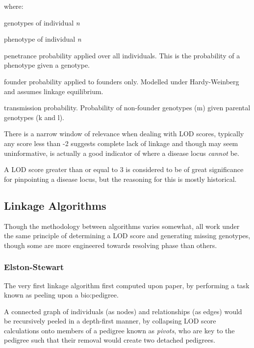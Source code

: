 where:
\begin{spacing}{1}
\begin{description}[labelsep=2em, align=right, labelwidth=3em, labelindent=4em, leftmargin=*]
\item[\(g_n\)]{genotypes of individual \textit{n}}
\item[\(Y_n\)]{phenotype of individual \textit{n}}
\item[\(P(Y_i|g_i)\)]{penetrance probability applied over all individuals. This is the probability of a phenotype given a genotype.}
\item[\(P(g_j)\)]{founder probability applied to founders only. Modelled under Hardy-Weinberg and assumes linkage equilibrium.}
\item[\(P(g_m|g_k,g_l)\)]{transmission probability. Probability of non-founder genotypes (m) given parental genotypes (k and l).}
\end{description}
\end{spacing}


There is a narrow window of relevance when dealing with LOD scores, typically any score less than -2 suggests complete lack of linkage and though may seem uninformative, is actually a good indicator of where a disease locus \textit{cannot} be.

A LOD score greater than or equal to 3 is considered to be of great significance for pinpointing a disease locus, but the reasoning for this is mostly historical.

\subsection{Linkage Algorithms}

Though the methodology between algorithms varies somewhat, all work under the same principle of determining a LOD score and generating missing genotypes, though some are more engineered towards resolving phase than others.

\subsubsection{Elston-Stewart}

The very first linkage algorithm first computed upon paper, by performing a task known as peeling upon a \gls{bio:pedigree}.

A connected graph of individuals (as nodes) and relationships (as edges) would be recursively peeled in a depth-first manner, by collapsing LOD score calculations onto members of a pedigree known as \textit{pivots}, who are key to the pedigree such that their removal would create two detached pedigrees. 

